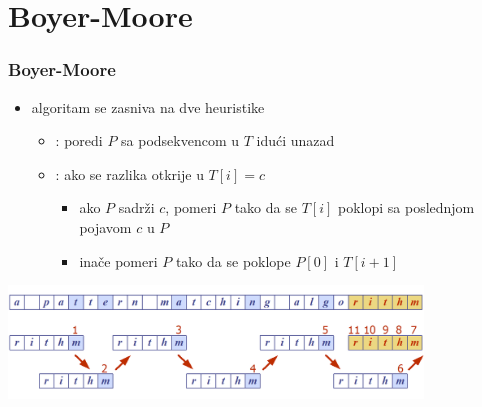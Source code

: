 \documentclass[compress]{beamer}
\begin{document}
\section[BM]{Boyer-Moore}

\begin{frame}[fragile]
  \frametitle{Boyer-Moore}
  \begin{itemize}
    \item {} algoritam se zasniva na dve heuristike
    \begin{itemize}
      \item {}: poredi $P$ sa podsekvencom u $T$ idući unazad
      \item {}: ako se razlika otkrije u $T[i]=c$
      \begin{itemize}
        \item ako $P$ sadrži $c$, pomeri $P$ tako da se $T[i]$ poklopi sa
        poslednjom pojavom $c$ u $P$
        \item inače pomeri $P$ tako da se poklope $P[0]$ i $T[i+1]$
      \end{itemize}
    \end{itemize}
  \end{itemize}
  \begin{center}
    \includegraphics[width=11cm]{asp-13-pic01.png}
  \end{center}
\end{frame}
\end{document}
